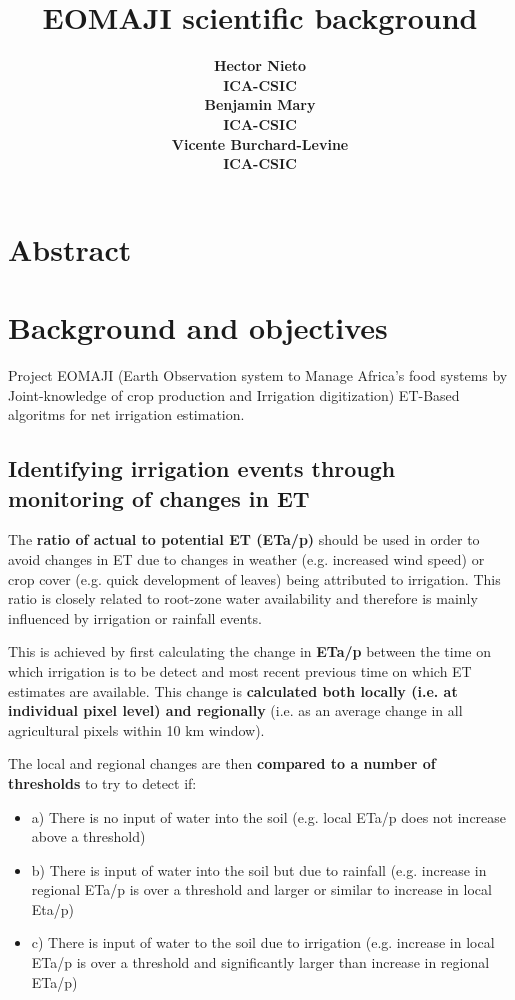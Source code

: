 \documentclass{article}
\title{EOMAJI scientific background}
\date{\displaydate{articleDate}}
\author{\bfseries Hector Nieto\mdseries\\ICA-CSIC\\\AND\bfseries Benjamin Mary\mdseries\\ICA-CSIC\\\AND\bfseries Vicente Burchard-Levine\mdseries\\ICA-CSIC\\}
\begin{document}
\maketitle
{}

\section{Abstract}

\section{Background and objectives}

% 
%

Project EOMAJI (Earth Observation system to Manage Africa's food systems by Joint-knowledge of crop production and Irrigation digitization)
ET-Based algoritms for net irrigation estimation.

\subsection{Identifying irrigation events through monitoring of changes in ET}

The \textbf{ratio of actual to potential ET (ETa/p)} should be used in order to avoid changes in ET
due to changes in weather (e.g. increased wind speed) or crop cover (e.g. quick development of
leaves) being attributed to irrigation. This ratio is closely related to root-zone water availability and
therefore is mainly influenced by irrigation or rainfall events.

This is achieved by first calculating the change in \textbf{ETa/p} between the time on which irrigation is to be detect and most recent previous time on which ET estimates are available. This change is \textbf{calculated both locally (i.e. at individual pixel level) and regionally} (i.e. as an average change in all agricultural pixels within 10 km window).

The local and regional changes are then \textbf{compared to a number of thresholds} to try to detect if:

\begin{itemize}
\item a) There is no input of water into the soil (e.g. local ETa/p does not increase above a threshold)
\item b) There is input of water into the soil but due to rainfall (e.g. increase in regional ETa/p is over a
threshold and larger or similar to increase in local Eta/p)
\item c) There is input of water to the soil due to irrigation (e.g. increase in local ETa/p is over a
threshold and significantly larger than increase in regional ETa/p)
\end{itemize}
\end{document}

